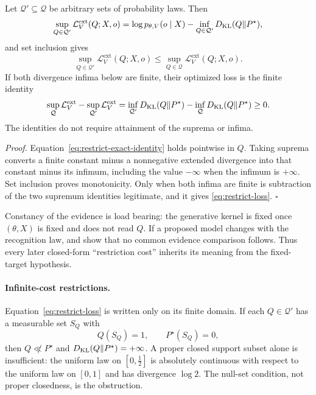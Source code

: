 Let \(\mathcal Q'\subseteq\mathcal Q\) be arbitrary sets of probability laws. Then
\begin{equation}
\sup_{Q\in\mathcal Q'}\mathcal L_V^{\mathrm{ext}}(Q;X,o)
=\log p_{\theta,V}(o\mid X)
-\inf_{Q\in\mathcal Q'}D_{\mathrm{KL}}(Q\Vert P^\star),
\label{eq:restrict-sup-identity}
\end{equation}
and set inclusion gives
\[
\sup_{Q\in\mathcal Q'}\mathcal L_V^{\mathrm{ext}}(Q;X,o)
\leq\sup_{Q\in\mathcal Q}\mathcal L_V^{\mathrm{ext}}(Q;X,o).
\]
If both divergence infima below are finite, their optimized loss is the finite identity
\begin{equation}
\sup_{\mathcal Q}\mathcal L_V^{\mathrm{ext}}
-\sup_{\mathcal Q'}\mathcal L_V^{\mathrm{ext}}
=\inf_{\mathcal Q'}D_{\mathrm{KL}}(Q\Vert P^\star)
-\inf_{\mathcal Q}D_{\mathrm{KL}}(Q\Vert P^\star)\geq0.
\label{eq:restrict-loss}
\end{equation}
The identities do not require attainment of the suprema or infima.

\emph{Proof.} Equation~\eqref{eq:restrict-exact-identity} holds pointwise in \(Q\). Taking suprema converts a finite constant minus a nonnegative extended divergence into that constant minus its infimum, including the value $-\infty$ when the infimum is $+\infty$. Set inclusion proves monotonicity. Only when both infima are finite is subtraction of the two supremum identities legitimate, and it gives \eqref{eq:restrict-loss}. \(\square\)

Constancy of the evidence is load bearing: the generative kernel is fixed
once \((\theta,X)\) is fixed and does not read \(Q\). If a proposed model
changes with the recognition law, 
and  show that no common evidence
comparison follows. Thus every later closed-form ``restriction cost''
inherits its meaning from the fixed-target hypothesis.

\paragraph{Infinite-cost restrictions.}
Equation~\eqref{eq:restrict-loss} is written only on its finite domain. If
each \(Q\in\mathcal Q'\) has a measurable set \(S_Q\) with
\begin{equation}
Q(S_Q)=1,\qquad P^\star(S_Q)=0,
\label{eq:restrict-posterior-null}
\end{equation}
then \(Q\not\ll P^\star\) and \(D_{\mathrm{KL}}(Q\Vert P^\star)=+\infty\). A proper
closed support subset alone is insufficient: the uniform law on
\([0,\tfrac12]\) is absolutely continuous with respect to the uniform law
on \([0,1]\) and has divergence \(\log2\). The null-set condition, not
proper closedness, is the obstruction. 

